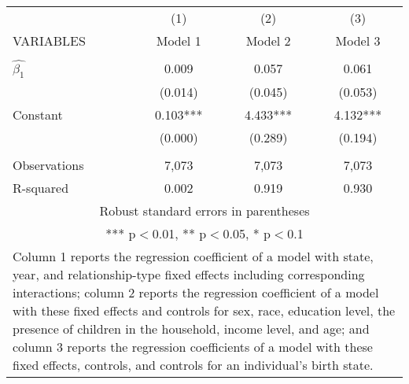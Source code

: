 \begin{tabular}{lccc}
\hline
 & (1) & (2) & (3) \\
VARIABLES & Model 1 & Model 2 & Model 3 \\ \hline
 &  &  &  \\
$\hat{\beta_1}$ & 0.009 & 0.057 & 0.061 \\
 & (0.014) & (0.045) & (0.053) \\
Constant & 0.103*** & 4.433*** & 4.132*** \\
 & (0.000) & (0.289) & (0.194) \\
 &  &  &  \\
Observations & 7,073 & 7,073 & 7,073 \\
 R-squared & 0.002 & 0.919 & 0.930 \\ \hline
\multicolumn{4}{c}{ Robust standard errors in parentheses} \\
\multicolumn{4}{c}{ *** p$<$0.01, ** p$<$0.05, * p$<$0.1} \\
\multicolumn{4}{p{0.8\linewidth}}{\small Column 1 reports the regression coefficient of a model with state, year, and relationship-type fixed effects including corresponding interactions; column 2 reports the regression coefficient of a model with these fixed effects and controls for sex, race, education level, the presence of children in the household, income level, and age; and column 3 reports the regression coefficients of a model with these fixed effects, controls, and controls for an individual’s birth state.} \\
\end{tabular}
